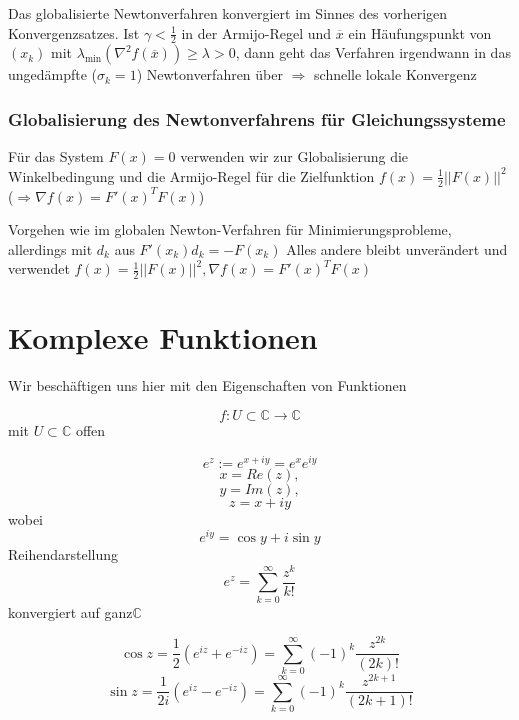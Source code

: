 \documentclass[10pt,a4paper]{article}
\begin{document}
\begin{satz}
Das globalisierte Newtonverfahren konvergiert im Sinnes des vorherigen Konvergenzsatzes. Ist $\gamma < \frac{1}{2}$ in der Armijo-Regel und $\overline{x}$ ein Häufungspunkt von $(x_k)$ mit $\lambda_{\min} (\nabla^{2}f(\overline{x})) \geq \lambda > 0$, dann geht das Verfahren irgendwann in das ungedämpfte ($\sigma_k=1$) Newtonverfahren über $\Rightarrow$ schnelle lokale Konvergenz
\end{satz}


\subsubsection{Globalisierung des Newtonverfahrens für Gleichungssysteme}
Für das System $F(x)=0$ verwenden wir zur Globalisierung die Winkelbedingung und die Armijo-Regel für die Zielfunktion $f(x)=\frac{1}{2}||F(x)||^{2}$($\Rightarrow \nabla f(x)=F'(x)^{T}F(x)$)



Vorgehen wie im globalen Newton-Verfahren für Minimierungsprobleme, allerdings mit $d_k$ aus $F'(x_k) d_k = -F(x_k)$ Alles andere bleibt unverändert und verwendet $f(x)=\frac{1}{2} ||F(x)||^{2}, \nabla f(x)=F'(x)^{T}F(x)$

\section{Komplexe Funktionen}
Wir beschäftigen uns hier mit den Eigenschaften von Funktionen

$$f: U \subset \mathbb{C} \rightarrow \mathbb{C}$$ mit $U \subset \mathbb{C}$ offen

\begin{defi}
$$e^{z}:=e^{x+iy}=e^{x}e^{iy}$$ $$x=Re(z),$$ $$y=Im(z), $$ $$z=x+iy$$ wobei $$e^{iy}=\cos y + i \sin y$$
Reihendarstellung $$e^{z}=\sum\limits_{k=0}^{\infty} \frac{z^{k}}{k!}$$ konvergiert auf ganz$ \mathbb{C}$
\end{defi}

\begin{defi}
$$\cos z = \frac{1}{2} (e^{iz}+e^{-iz})=\sum\limits_{k=0}^{\infty}(-1)^{k} \frac{z^{2k}}{(2k)!}$$
$$\sin z = \frac{1}{2i} (e^{iz}-e^{-iz})=\sum\limits_{k=0}^{\infty}(-1)^{k} \frac{z^{2k+1}}{(2k+1)!}$$
\end{defi}

\end{document}
